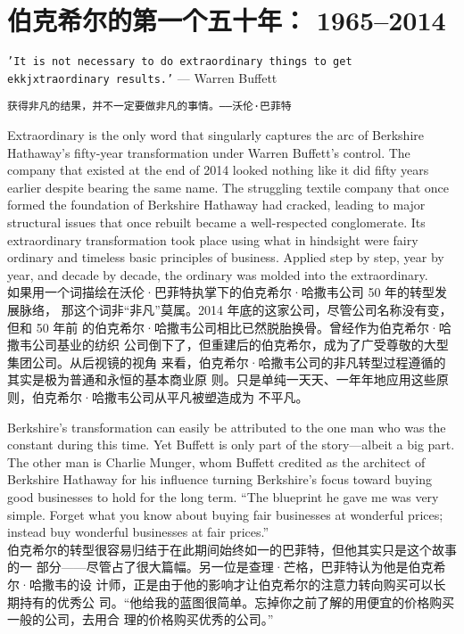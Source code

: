 \chapter{伯克希尔的第一个五十年： 1965--2014}

\begin{center}
  \texttt{'It is not necessary to do extraordinary things to get ekkjxtraordinary
    results.'} --- Warren Buffett

  \texttt{获得非凡的结果，并不一定要做非凡的事情。——沃伦·巴菲特}
\end{center}

\begin{verseparallel}
  {
    \noindent Extraordinary is the only word that singularly captures the arc of
    Berkshire Hathaway's fifty-year transformation under Warren Buffett's
    control. The company that existed at the end of 2014 looked nothing like it
    did fifty years earlier despite bearing the same name. The struggling
    textile company that once formed the foundation of Berkshire Hathaway had
    cracked, leading to major structural issues that once rebuilt became a
    well-respected conglomerate. Its extraordinary transformation took place
    using what in hindsight were fairy ordinary and timeless basic principles of
    business. Applied step by step, year by year, and decade by decade, the
    ordinary was molded into the extraordinary. \\
  }
  {
    如果用一个词描绘在沃伦·巴菲特执掌下的伯克希尔·哈撒韦公司 50 年的转型发展脉络，
    那这个词非“非凡”莫属。2014 年底的这家公司，尽管公司名称没有变，但和 50 年前
    的伯克希尔·哈撒韦公司相比已然脱胎换骨。曾经作为伯克希尔·哈撒韦公司基业的纺织
    公司倒下了，但重建后的伯克希尔，成为了广受尊敬的大型集团公司。从后视镜的视角
    来看，伯克希尔·哈撒韦公司的非凡转型过程遵循的其实是极为普通和永恒的基本商业原
    则。只是单纯一天天、一年年地应用这些原则，伯克希尔·哈撒韦公司从平凡被塑造成为
    不平凡。
  }
\end{verseparallel}

\begin{verseparallel}
  {
    Berkshire's transformation can easily be attributed to the one man who was
    the constant during this time. Yet Buffett is only part of the story---albeit a
    big part. The other man is Charlie Munger, whom Buffett credited as the
    architect of Berkshire Hathaway for his influence turning Berkshire's focus
    toward buying good businesses to hold for the long term. ``The blueprint he
    gave me was very simple. Forget what you know about buying fair
    businesses at wonderful prices; instead buy wonderful businesses at fair
    prices.'' \\
  }
  {
    伯克希尔的转型很容易归结于在此期间始终如一的巴菲特，但他其实只是这个故事的一
    部分——尽管占了很大篇幅。另一位是查理·芒格，巴菲特认为他是伯克希尔·哈撒韦的设
    计师，正是由于他的影响才让伯克希尔的注意力转向购买可以长期持有的优秀公
    司。“他给我的蓝图很简单。忘掉你之前了解的用便宜的价格购买一般的公司，去用合
    理的价格购买优秀的公司。”
  }
\end{verseparallel}

